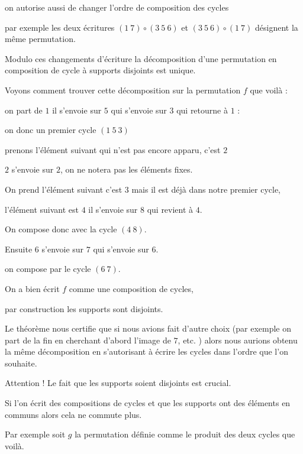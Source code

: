 \change

on autorise aussi de changer l'ordre de composition des cycles 

par exemple 
les deux écritures $(1\ 7) \circ (3\ 5\ 6)$ et $(3\ 5\ 6) \circ (1\ 7)$ 
désignent la même permutation.


Modulo ces changements d'écriture  la décomposition d'une permutation en composition 
de cycle à supports disjoints est unique.

\change

Voyons comment trouver cette décomposition sur la permutation $f$ que voilà :

on part de $1$ il s'envoie sur $5$ qui s'envoie sur $3$ qui retourne à $1$ :

\change

on donc un premier cycle $(1\ 5\ 3)$

prenons l'élément suivant qui n'est pas encore apparu, c'est $2$

$2$ s'envoie sur $2$, on ne notera pas les éléments fixes.

On prend l'élément suivant c'est $3$ mais il est déjà dans notre premier cycle,

l'élément suivant est $4$ il s'envoie sur $8$ qui revient à $4$.

On compose donc avec la cycle $(4\ 8)$.

\change

Ensuite $6$ s'envoie sur $7$ qui s'envoie sur $6$.

on compose par le cycle $(6\ 7)$.

\change

On a bien écrit $f$ comme une composition de cycles,

par construction les supports sont disjoints.

Le théorème nous certifie que si nous avions fait d'autre choix (par exemple on part
de la fin en cherchant d'abord l'image de $7$, etc. ) alors nous aurions 
obtenu la même décomposition en s'autorisant à écrire les cycles dans l'ordre que l'on souhaite.

\change

Attention ! Le fait que les supports soient disjoints est crucial.

Si l'on écrit des compositions de cycles et que les supports ont des éléments en communs alors 
cela ne commute plus.

\change

Par exemple soit $g$ la permutation définie comme le produit des deux cycles que voilà.

